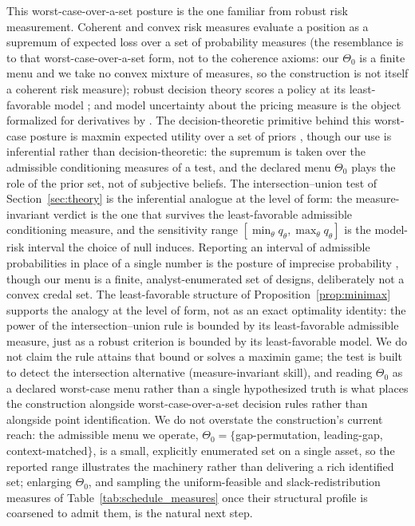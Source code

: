 \documentclass[risks,article,submit,pdftex,oneauthor]{Definitions/mdpi}
\begin{document}
This worst-case-over-a-set posture is the one familiar from robust risk
measurement. Coherent and convex risk measures evaluate a position as a supremum of
expected loss over a set of probability measures \citep{ArtznerDelbaenEberHeath1999}
(the resemblance is to that worst-case-over-a-set form, not to the coherence axioms:
our $\Theta_0$ is a finite menu and we take no convex mixture of measures, so the
construction is not itself a coherent risk measure); robust decision theory scores a
policy at its least-favorable model \citep{HansenSargent2008}; and model uncertainty
about the pricing measure is the object formalized for derivatives by
\citep{Cont2006}. The decision-theoretic primitive behind this worst-case posture is maxmin expected utility over a set of priors \citep{GilboaSchmeidler1989}, though our use is inferential rather than decision-theoretic: the supremum is taken over the admissible conditioning measures of a test, and the declared menu $\Theta_0$ plays the role of the prior set, not of subjective beliefs. The intersection--union test of Section~\ref{sec:theory} is the
inferential analogue at the level of form: the measure-invariant verdict is the one
that survives the least-favorable admissible conditioning measure, and the
sensitivity range $[\min_\theta q_\theta,\max_\theta q_\theta]$ is the model-risk
interval the choice of null induces. Reporting an interval of admissible probabilities in place of a single number is the posture of imprecise probability \citep{Walley1991}, though our menu is a finite, analyst-enumerated set of designs, deliberately not a convex credal set. The least-favorable structure of
Proposition~\ref{prop:minimax} supports the analogy at the level of form, not as an
exact optimality identity: the power of the intersection--union rule is bounded by
its least-favorable admissible measure, just as a robust criterion is bounded by its
least-favorable model. We do not claim the rule attains that bound or solves a
maximin game; the test is built to detect the intersection alternative
(measure-invariant skill), and reading $\Theta_0$ as a declared worst-case menu
rather than a single hypothesized truth is what places the construction alongside
worst-case-over-a-set decision rules rather than alongside point identification. We do not overstate the construction's current reach: the
admissible menu we operate, $\Theta_0=\{$gap-permutation, leading-gap,
context-matched$\}$, is a small, explicitly enumerated set on a single asset, so the
reported range illustrates the machinery rather than delivering a rich identified set;
enlarging $\Theta_0$, and sampling the uniform-feasible and slack-redistribution
measures of Table~\ref{tab:schedule_measures} once their structural profile is
coarsened to admit them, is the natural next step.
\end{document}
